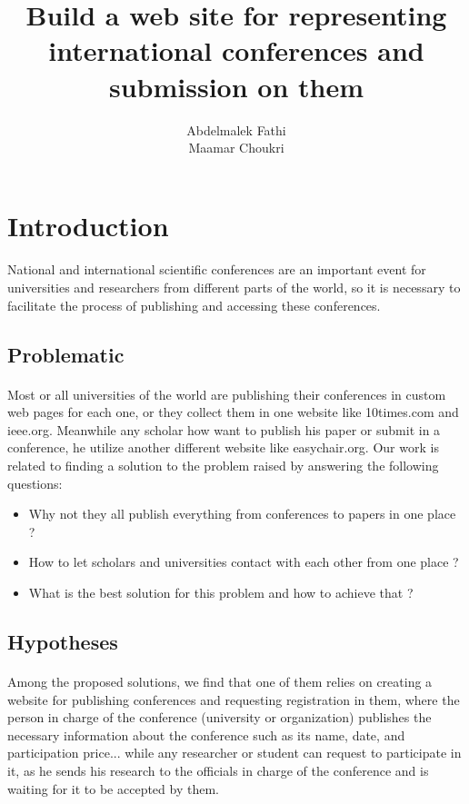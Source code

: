 \documentclass[12pt,a4paper]{article}
\date{}
\begin{document}
	
	\title{Build a web site for representing international conferences and submission on them}
	\author{Abdelmalek Fathi\\Maamar Choukri}
	\maketitle
	\clearpage
	\listoffigures
	\listoftables
	\clearpage
	\tableofcontents
	\clearpage
	
	\section{Introduction}
	\paragraph{}
	National and international scientific conferences are an important event for universities and researchers from different parts of the world, so it is necessary to facilitate the process of publishing and accessing these conferences.
	\subsection{Problematic}
	\paragraph{}
	Most or all universities of the world are publishing their conferences in custom web pages for each one, or they collect them in one website like 10times.com and ieee.org. Meanwhile any scholar how want to publish his paper or submit in a conference, he utilize another different website like easychair.org. Our work is related to finding a solution to the problem raised by answering the following questions:
	\begin{itemize}
		\item Why not they all publish everything from conferences to papers in one place ?
		\item How to let scholars and universities contact with each other from one place ?
		\item What is the best solution for this problem and how to achieve that ?
	\end{itemize}
	\subsection{Hypotheses}
	\paragraph{}
	Among the proposed solutions, we find that one of them relies on creating a website for publishing conferences and requesting registration in them, where the person in charge of the conference (university or organization) publishes the necessary information about the conference such as its name, date, and participation price... while any researcher or student can request to participate in it, as he sends his research to the officials in charge of the conference and is waiting for it to be accepted by them.
\end{document}

